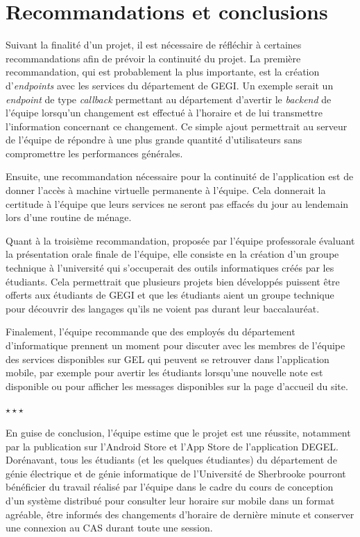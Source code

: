 \section{Recommandations et conclusions}
Suivant la finalité d'un projet, il est nécessaire de réfléchir à certaines recommandations afin de prévoir la continuité du projet. La première recommandation, qui est probablement la plus importante, est la création d'\emph{endpoints} avec les services du département de GEGI. Un exemple serait un \emph{endpoint} de type \emph{callback} permettant au département d'avertir le \emph{backend} de l'équipe lorsqu'un changement est effectué à l'horaire et de lui transmettre l'information concernant ce changement. Ce simple ajout permettrait au serveur de l'équipe de répondre à une plus grande quantité d'utilisateurs sans compromettre les performances générales.

Ensuite, une recommandation nécessaire pour la continuité de l'application est de donner l'accès à machine virtuelle permanente à l'équipe. Cela donnerait la certitude à l'équipe que leurs services ne seront pas effacés du jour au lendemain lors d'une routine de ménage.

Quant à la troisième recommandation, proposée par l'équipe professorale évaluant la présentation orale finale de l'équipe, elle consiste en la création d'un groupe technique à l'université qui s'occuperait des outils informatiques créés par les étudiants. Cela permettrait que plusieurs projets bien développés puissent être offerts aux étudiants de GEGI et que les étudiants aient un groupe technique pour découvrir des langages qu'ils ne voient pas durant leur baccalauréat.

Finalement, l'équipe recommande que des employés du département d'informatique prennent un moment pour discuter avec les membres de l'équipe des services disponibles sur GEL qui peuvent se retrouver dans l'application mobile, par exemple pour avertir les étudiants lorsqu'une nouvelle note est disponible ou pour afficher les messages disponibles sur la page d'accueil du site.

{%
\centering%
$\star\star\star$
\par%
}

En guise de conclusion, l'équipe estime que le projet est une réussite, notamment par la publication sur l'Android Store et l'App Store de l'application DEGEL. Dorénavant, tous les étudiants (et les quelques étudiantes) du département de génie électrique et de génie informatique de l'Université de Sherbrooke pourront bénéficier du travail réalisé par l'équipe dans le cadre du cours de conception d'un système distribué pour consulter leur horaire sur mobile dans un format agréable, être informés des changements d'horaire de dernière minute et conserver une connexion au CAS durant toute une session.

